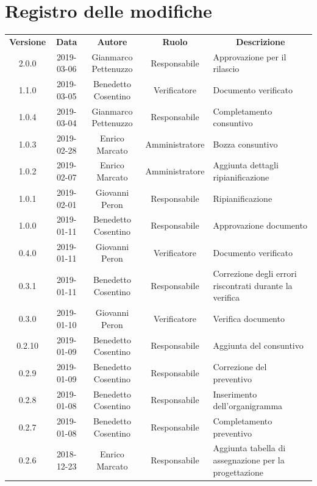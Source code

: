 \documentclass[11pt,a4paper]{article}
\begin{document}
	
	\newpage
	\section*{\centering Registro delle modifiche}
	\begin{tabularx}{\textwidth}{ c | c | c | c | X }
		\rowcolor{LightBlue}
		\color{white}\bfseries Versione & 
		\color{white}\bfseries Data & 
		\color{white}\bfseries Autore & 
		\color{white}\bfseries Ruolo & 
		\multicolumn{1}{c}{\color{white}\bfseries Descrizione}\\[0.25cm]
		2.0.0 & 2019-03-06 & Gianmarco Pettenuzzo & Responsabile & Approvazione per il rilascio\\ \hline
		1.1.0 & 2019-03-05 & Benedetto Cosentino & Verificatore & Documento verificato\\ \hline
		1.0.4 & 2019-03-04 & Gianmarco Pettenuzzo & Responsabile & Completamento consuntivo\\ \hline
		1.0.3 & 2019-02-28 & Enrico Marcato & Amministratore & Bozza consuntivo\\ \hline
		1.0.2 & 2019-02-07 & Enrico Marcato & Amministratore & Aggiunta dettagli ripianificazione\\ \hline
		1.0.1 & 2019-02-01 & Giovanni Peron & Responsabile & Ripianificazione\\ \hline
		1.0.0 & 2019-01-11 & Benedetto Cosentino & Responsabile & Approvazione documento\\ \hline
		0.4.0 & 2019-01-11 & Giovanni Peron & Verificatore & Documento verificato\\ \hline
		0.3.1 & 2019-01-11 & Benedetto Cosentino & Responsabile & Correzione degli errori riscontrati durante la verifica \\ \hline
		0.3.0 & 2019-01-10 & Giovanni Peron & Verificatore & Verifica documento\\ \hline
		0.2.10 & 2019-01-09 & Benedetto Cosentino & Responsabile & Aggiunta del consuntivo\\ \hline
		0.2.9 & 2019-01-09 & Benedetto Cosentino & Responsabile & Correzione del preventivo\\ \hline
		0.2.8 & 2019-01-08 & Benedetto Cosentino & Responsabile & Inserimento dell'organigramma \\ \hline
		0.2.7 & 2019-01-08 & Benedetto Cosentino & Responsabile & Completamento preventivo \\ \hline	
		0.2.6 & 2018-12-23 & Enrico Marcato & Responsabile & Aggiunta tabella di assegnazione per la progettazione\\ \hline

\end{tabularx}
\end{document}
